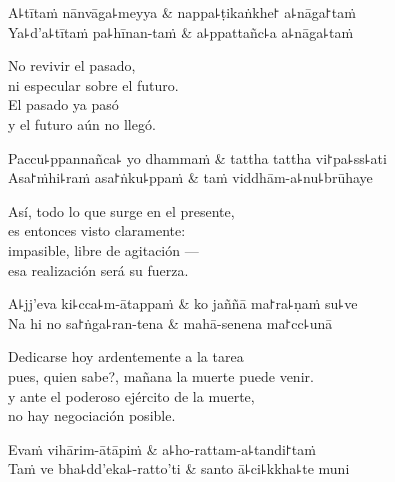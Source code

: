 \begin{twochants}
  A꜕tītaṁ nānvāga꜕meyya & nappa꜕ṭikaṅkhe꜓ a꜕nāga꜓taṁ \\
  Ya꜕d'a꜕tītaṁ pa꜕hīnan-taṁ & a꜕ppattañc꜕a a꜕nāga꜕taṁ \\
\end{twochants}

\begin{english}
  No revivir el pasado,\\
  ni especular sobre el futuro.\\
  El pasado ya pasó\\
  y el futuro aún no llegó.
\end{english}

\begin{twochants}
  Paccu꜕ppannañca꜕ yo dhammaṁ & tattha tattha vi꜓pa꜕ss꜕ati \\
  Asa꜓ṁhi꜕raṁ asa꜓ṅku꜕ppaṁ & taṁ viddhām-a꜕nu꜕brūhaye \\
\end{twochants}

\begin{english}
  Así, todo lo que surge en el presente,\\
  es entonces visto claramente:\\
  impasible, libre de agitación ---\\
  esa realización será su fuerza.
\end{english}

\begin{twochants}
  A꜕jj'eva ki꜕cca꜕m-ātappaṁ & ko jaññā ma꜓ra꜕ṇaṁ su꜕ve \\
  Na hi no sa꜓ṅga꜕ran-tena & mahā-senena ma꜓cc꜕unā \\
\end{twochants}

\begin{english}
  Dedicarse hoy ardentemente a la tarea\\
  pues, quien sabe?, mañana la muerte puede venir.\\
  y ante el poderoso ejército de la muerte,\\
  no hay negociación posible.
\end{english}

\clearpage

\begin{twochants}
  Evaṁ vihārim-ātāpiṁ & a꜕ho-rattam-a꜕tandi꜓taṁ \\
  Taṁ ve bha꜕dd'eka꜕-ratto'ti & santo ā꜕ci꜕kkha꜕te muni \\
\end{twochants}

